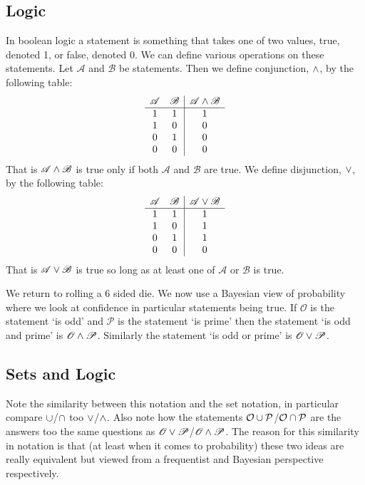         \subsection{Logic}
        In boolean logic a statement is something that takes one of two values, true, denoted 1, or false, denoted 0.
        We can define various operations on these statements.
        Let \(\mathscr{A}\) and \(\mathscr{B}\) be statements.
        Then we define conjunction, \(\wedge\), by the following table:
        \[
            \begin{array}{cc|c}
                \mathscr{A} & \mathscr{B} & \mathscr{A} \wedge \mathscr{B}\\\hline
                1 & 1 & 1\\
                1 & 0 & 0\\
                0 & 1 & 0\\
                0 & 0 & 0
            \end{array}
        \]
        That is \(\mathscr{A}\wedge\mathscr{B}\) is true only if both \(\mathscr{A}\) and \(\mathscr{B}\) are true.
        We define disjunction, \(\vee\), by the following table:
        \[
            \begin{array}{cc|c}
                \mathscr{A} & \mathscr{B} & \mathscr{A} \vee \mathscr{B}\\\hline
                1 & 1 & 1\\
                1 & 0 & 1\\
                0 & 1 & 1\\
                0 & 0 & 0
            \end{array}
        \]
        That is \(\mathscr{A}\vee\mathscr{B}\) is true so long as at least one of \(\mathscr{A}\) or \(\mathscr{B}\) is true.
        
        We return to rolling a 6 sided die.
        We now use a Bayesian view of probability where we look at confidence in particular statements being true.
        If \(\mathscr{O}\) is the statement `is odd' and \(\mathscr{P}\) is the statement `is prime' then the statement `is odd and prime' is \(\mathscr{O}\wedge\mathscr{P}\).
        Similarly the statement `is odd or prime' is \(\mathscr{O}\vee\mathscr{P}\).
        
        \subsection{Sets and Logic}
        Note the similarity between this notation and the set notation, in particular compare \(\cup\)/\(\cap\) too \(\vee\)/\(\wedge\).
        Also note how the statements \(\mathcal{O}\cup\mathcal{P}\)/\(\mathcal{O}\cap\mathcal{P}\) are the answers too the same questions as \(\mathscr{O}\vee\mathscr{P}\)/\(\mathscr{O}\wedge\mathscr{P}\).
        The reason for this similarity in notation is that (at least when it comes to probability) these two ideas are really equivalent but viewed from a frequentist and Bayesian perspective respectively.
        

